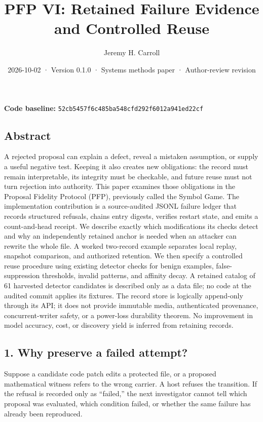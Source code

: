 \documentclass[
  11pt,
]{article}
\title{PFP VI: Retained Failure Evidence and Controlled Reuse}
\author{Jeremy H. Carroll}
\date{2026-10-02 · Version 0.1.0 · Systems methods paper · Author-review
revision}
\begin{document}
\makeatletter
\begin{center}
{\LARGE \@title\par}
\vspace{0.8em}
{\normalsize \@author\par}
\vspace{0.5em}
{\small \@date\par}
\end{center}
\makeatother

\textbf{Code baseline:}
\nolinkurl{52cb5457f6c485ba548cfd292f6012a941ed22cf}

\subsection{Abstract}\label{abstract}

A rejected proposal can explain a defect, reveal a mistaken assumption,
or supply a useful negative test. Keeping it also creates new
obligations: the record must remain interpretable, its integrity must be
checkable, and future reuse must not turn rejection into authority. This
paper examines those obligations in the Proposal Fidelity Protocol
(PFP), previously called the Symbol Game. The implementation
contribution is a source-audited JSONL failure ledger that records
structured refusals, chains entry digests, verifies restart state, and
emits a count-and-head receipt. We describe exactly which modifications
its checks detect and why an independently retained anchor is needed
when an attacker can rewrite the whole file. A worked two-record example
separates local replay, snapshot comparison, and authorized retention.
We then specify a controlled reuse procedure using existing detector
checks for benign examples, false-suppression thresholds, invalid
patterns, and affinity decay. A retained catalog of 61 harvested
detector candidates is described only as a data file; no code at the
audited commit applies its fixtures. The record store is logically
append-only through its API; it does not provide immutable media,
authenticated provenance, concurrent-writer safety, or a power-loss
durability theorem. No improvement in model accuracy, cost, or discovery
yield is inferred from retaining records.

\subsection{1. Why preserve a failed
attempt?}\label{why-preserve-a-failed-attempt}

Suppose a candidate code patch edits a protected file, or a proposed
mathematical witness refers to the wrong carrier. A host refuses the
transition. If the refusal is recorded only as ``failed,'' the next
investigator cannot tell which proposal was evaluated, which condition
failed, or whether the same failure has already been reproduced.
\end{document}
